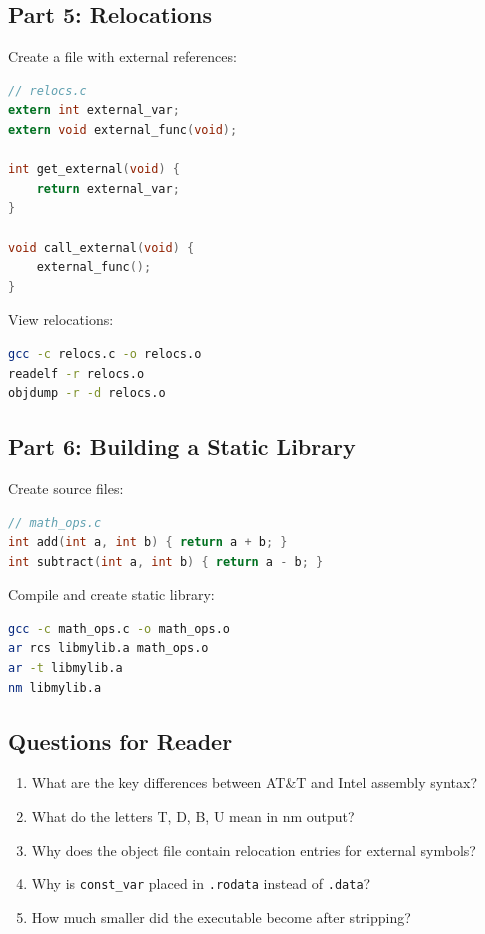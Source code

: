 \subsection{Part 5: Relocations}

Create a file with external references:

\begin{lstlisting}[language=C]
// relocs.c
extern int external_var;
extern void external_func(void);

int get_external(void) {
    return external_var;
}

void call_external(void) {
    external_func();
}
\end{lstlisting}

View relocations:

\begin{lstlisting}[language=bash]
gcc -c relocs.c -o relocs.o
readelf -r relocs.o
objdump -r -d relocs.o
\end{lstlisting}

\subsection{Part 6: Building a Static Library}

Create source files:

\begin{lstlisting}[language=C]
// math_ops.c
int add(int a, int b) { return a + b; }
int subtract(int a, int b) { return a - b; }
\end{lstlisting}

Compile and create static library:

\begin{lstlisting}[language=bash]
gcc -c math_ops.c -o math_ops.o
ar rcs libmylib.a math_ops.o
ar -t libmylib.a
nm libmylib.a
\end{lstlisting}

\subsection{Questions for Reader}

\begin{enumerate}
\item What are the key differences between AT\&T and Intel assembly syntax?
\item What do the letters T, D, B, U mean in nm output?
\item Why does the object file contain relocation entries for external symbols?
\item Why is \texttt{const\_var} placed in \texttt{.rodata} instead of \texttt{.data}?
\item How much smaller did the executable become after stripping?
\end{enumerate}

